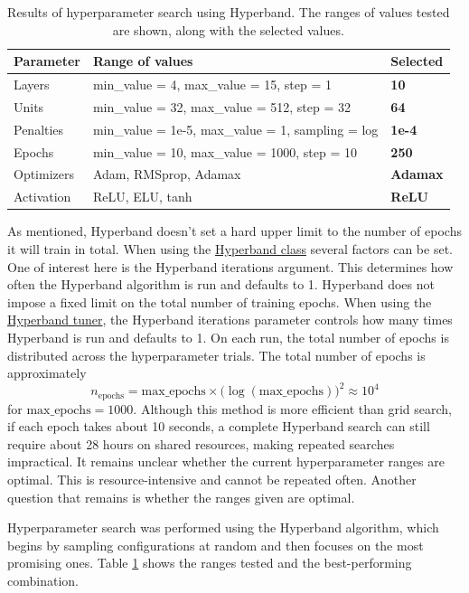 \begin{table}[h]
    \centering
    \caption[Hyperparameter search with Hyperband]{Results of hyperparameter search using Hyperband. The ranges of values tested are shown, along with the selected values.}
    \label{table:gridSearchHyperparameters}
    \begin{tabular}{lll}
        \toprule
        Parameter & Range of values & Selected\\
        \midrule
        Layers &  min\_value = 4, max\_value = 15, step = 1 & \textbf{10}\\
        Units &  min\_value = 32, max\_value = 512, step = 32 & \textbf{64}\\
        Penalties & min\_value = 1e-5, max\_value = 1, sampling = log & \textbf{1e-4}\\
        Epochs & min\_value = 10, max\_value = 1000, step = 10 & \textbf{250}\\
        Optimizers & Adam, RMSprop, Adamax & \textbf{Adamax}\\
        Activation & ReLU, ELU, tanh & \textbf{ReLU}\\
        \bottomrule
    \end{tabular}
\end{table}

As mentioned, Hyperband doesn't set a hard upper limit to the number of epochs it will train in total. When using the \href{https://keras.io/api/keras_tuner/tuners/hyperband/}{Hyperband class} several factors can be set. One of interest here is the Hyperband iterations argument. This determines how often the Hyperband algorithm is run and defaults to 1. Hyperband does not impose a fixed limit on the total number of training epochs. When using the \href{https://keras.io/api/keras_tuner/tuners/hyperband/}{Hyperband tuner}, the Hyperband iterations parameter controls how many times Hyperband is run and defaults to 1. On each run, the total number of epochs is distributed across the hyperparameter trials. The total number of epochs is approximately
%
\begin{equation*}
n_{\mathrm{epochs}} = \text{max\_epochs} \times \bigl(\log(\text{max\_epochs})\bigr)^2 \approx 10^4
\end{equation*}
%
for $ \text{max\_epochs} = 1000$. Although this method is more efficient than grid search, if each epoch takes about 10 seconds, a complete Hyperband search can still require about 28 hours on shared resources, making repeated searches impractical. It remains unclear whether the current hyperparameter ranges are optimal. This is resource-intensive and cannot be repeated often. Another question that remains is whether the ranges given are optimal.

Hyperparameter search was performed using the Hyperband algorithm, which begins by sampling configurations at random and then focuses on the most promising ones. Table \ref{table:gridSearchHyperparameters} shows the ranges tested and the best-performing combination.